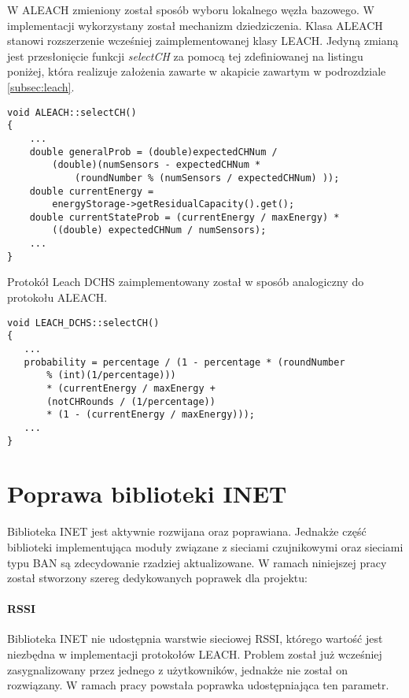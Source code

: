 W ALEACH zmieniony został sposób wyboru lokalnego węzła bazowego. W implementacji wykorzystany został mechanizm dziedziczenia. Klasa ALEACH stanowi rozszerzenie wcześniej zaimplementowanej klasy LEACH. Jedyną zmianą jest przesłonięcie funkcji \textit{selectCH} za pomocą tej zdefiniowanej na listingu poniżej, która realizuje założenia zawarte w akapicie  zawartym w podrozdziale \ref{subsec:leach}.
\begin{verbatim}
void ALEACH::selectCH()
{
    ...
    double generalProb = (double)expectedCHNum / 
        (double)(numSensors - expectedCHNum * 
            (roundNumber % (numSensors / expectedCHNum) ));
    double currentEnergy = 
        energyStorage->getResidualCapacity().get();
    double currentStateProb = (currentEnergy / maxEnergy) *
        ((double) expectedCHNum / numSensors);
    ...
}
\end{verbatim}

Protokół Leach DCHS zaimplementowany został w sposób analogiczny do protokołu ALEACH.
\begin{verbatim}
void LEACH_DCHS::selectCH()
{
   ...
   probability = percentage / (1 - percentage * (roundNumber
       % (int)(1/percentage)))
       * (currentEnergy / maxEnergy +
       (notCHRounds / (1/percentage))
       * (1 - (currentEnergy / maxEnergy)));
   ...
}
\end{verbatim}
\section{Poprawa biblioteki INET}
Biblioteka INET jest aktywnie rozwijana oraz poprawiana. Jednakże część biblioteki implementująca moduły związane z sieciami czujnikowymi oraz sieciami typu BAN są zdecydowanie rzadziej aktualizowane. W ramach niniejszej pracy został stworzony szereg dedykowanych poprawek dla projektu:

\paragraph{RSSI} Biblioteka INET nie udostępnia warstwie sieciowej RSSI, którego wartość jest niezbędna w implementacji protokołów LEACH. Problem został już wcześniej zasygnalizowany przez jednego z użytkowników, jednakże nie został on rozwiązany. W ramach pracy powstała poprawka udostępniająca ten parametr.

